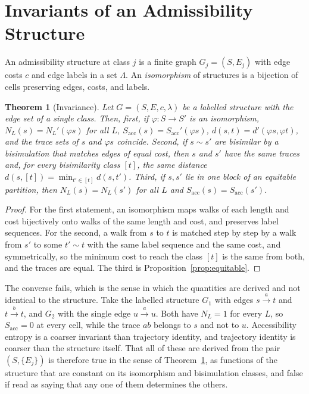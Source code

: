 \documentclass[11pt,openany]{book}
\theoremstyle{plain}
\newtheorem{theorem}{Theorem}[chapter]
\theoremstyle{definition}
\theoremstyle{remark}
\newcommand{\Sacc}{S_{\mathrm{acc}}}
\begin{document}
\section{Invariants of an Admissibility Structure}

An admissibility structure at class $j$ is a finite graph $G_j=(S,E_j)$ with edge costs $c$ and edge labels in a set $\Lambda$. An \emph{isomorphism} of structures is a bijection of cells preserving edges, costs, and labels.

\begin{theorem}[Invariance]
\label{thm:invariance}
Let $G=(S,E,c,\lambda)$ be a labelled structure with the edge set of a single class. Then, first, if $\varphi:S\to S'$ is an isomorphism, $N_L(s)=N_L'(\varphi s)$ for all $L$, $\Sacc(s)=\Sacc'(\varphi s)$, $d(s,t)=d'(\varphi s,\varphi t)$, and the trace sets of $s$ and $\varphi s$ coincide. Second, if $s\sim s'$ are bisimilar by a bisimulation that matches edges of equal cost, then $s$ and $s'$ have the same traces and, for every bisimilarity class $[t]$, the same distance $d(s,[t])=\min_{t'\in[t]}d(s,t')$. Third, if $s,s'$ lie in one block of an equitable partition, then $N_L(s)=N_L(s')$ for all $L$ and $\Sacc(s)=\Sacc(s')$.
\end{theorem}
\begin{proof}
For the first statement, an isomorphism maps walks of each length and cost bijectively onto walks of the same length and cost, and preserves label sequences. For the second, a walk from $s$ to $t$ is matched step by step by a walk from $s'$ to some $t'\sim t$ with the same label sequence and the same cost, and symmetrically, so the minimum cost to reach the class $[t]$ is the same from both, and the traces are equal. The third is Proposition~\ref{prop:equitable}.
\end{proof}

The converse fails, which is the sense in which the quantities are derived and not identical to the structure. Take the labelled structure $G_1$ with edges $s\xrightarrow{a}t$ and $t\xrightarrow{b}t$, and $G_2$ with the single edge $u\xrightarrow{a}u$. Both have $N_L=1$ for every $L$, so $\Sacc=0$ at every cell, while the trace $ab$ belongs to $s$ and not to $u$. Accessibility entropy is a coarser invariant than trajectory identity, and trajectory identity is coarser than the structure itself. That all of these are derived from the pair $(S,\{E_j\})$ is therefore true in the sense of Theorem~\ref{thm:invariance}, as functions of the structure that are constant on its isomorphism and bisimulation classes, and false if read as saying that any one of them determines the others.
\end{document}
